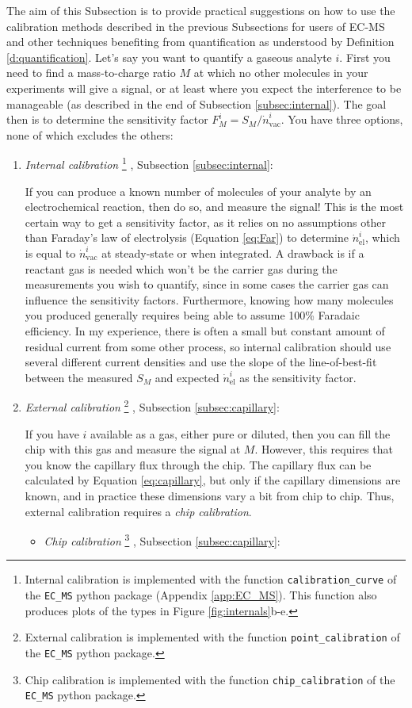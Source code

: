 The aim of this Subsection is to provide practical suggestions on how to use the calibration methods described in the previous Subsections for users of EC-MS and other techniques benefiting from quantification as understood by Definition \ref{d:quantification}. Let's say you want to quantify a gaseous analyte $i$. First you need to find a mass-to-charge ratio $M$ at which no other molecules in your experiments will give a signal, or at least where you expect the interference to be manageable (as described in the end of Subsection \ref{subsec:internal}). The goal then is to determine the sensitivity factor $F_M^i = S_M/\dot{n}^i_\text{vac}$. You have three options, none of which excludes the others:
\begin{enumerate}
\item 
\textit{Internal calibration}
\footnote{Internal calibration is implemented with the function \texttt{calibration\_curve} of the \texttt{EC\_MS} python package (Appendix \ref{app:EC_MS}). This function also produces plots of the types in Figure \ref{fig:internals}b-e.}
, Subsection \ref{subsec:internal}:

If you can produce a known number of molecules of your analyte by an electrochemical reaction, then do so, and measure the signal! This is the most certain way to get a sensitivity factor, as it relies on no assumptions other than Faraday's law of electrolysis (Equation \ref{eq:Far}) to determine $\dot{n}^i_\text{el}$, which is equal to $\dot{n}^i_\text{vac}$ at steady-state or when integrated. A drawback is if a reactant gas is needed which won't be the carrier gas during the measurements you wish to quantify, since in some cases the carrier gas can influence the sensitivity factors. Furthermore, knowing how many molecules you produced generally requires being able to assume 100\% Faradaic efficiency. In my experience, there is often a small but constant amount of residual current from some other process, so internal calibration should use several different current densities and use the slope of the line-of-best-fit between the measured $S_M$ and expected $\dot{n}^i_\text{el}$ as the sensitivity factor.

\item 
\textit{External calibration}
\footnote{External calibration is implemented with the function \texttt{point\_calibration} of the \texttt{EC\_MS} python package.}
, Subsection \ref{subsec:capillary}:

If you have $i$ available as a gas, either pure or diluted, then you can fill the chip with this gas and measure the signal at $M$. However, this requires that you know the capillary flux through the chip. The capillary flux can be calculated by Equation \ref{eq:capillary}, but only if the capillary dimensions are known, and in practice these dimensions vary a bit from chip to chip. Thus, external calibration requires a \textit{chip calibration}.
\begin{itemize}
	\item \textit{Chip calibration}
	\footnote{Chip calibration is implemented with the function \texttt{chip\_calibration} of the \texttt{EC\_MS} python package.}
	, Subsection \ref{subsec:capillary}:
	

\end{itemize}
\end{enumerate}
